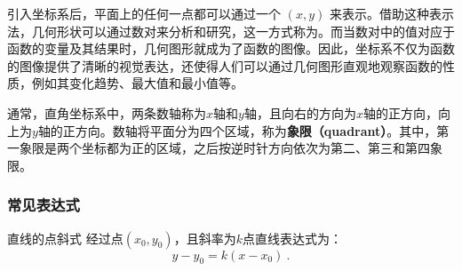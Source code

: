 引入坐标系后，平面上的任何一点都可以通过一个 $(x, y)$ 来表示。借助这种表示法，几何形状可以通过数对来分析和研究，这一方式称为。而当数对中的值对应于函数的变量及其结果时，几何图形就成为了函数的图像。因此，坐标系不仅为函数的图像提供了清晰的视觉表达，还使得人们可以通过几何图形直观地观察函数的性质，例如其变化趋势、最大值和最小值等。

通常，直角坐标系中，两条数轴称为$x$轴和$y$轴，且向右的方向为$x$轴的正方向，向上为$y$轴的正方向。数轴将平面分为四个区域，称为\textbf{象限（quadrant）}。其中，第一象限是两个坐标都为正的区域，之后按逆时针方向依次为第二、第三和第四象限。

\subsubsection{常见表达式}

\begin{definition}{直线的点斜式}\label{def_HsGeBa_1}
经过点$(x_0,y_0)$，且斜率为$k$点直线表达式为：
\begin{equation}
y-y_0=k(x-x_0)~.
\end{equation}
\end{definition}

